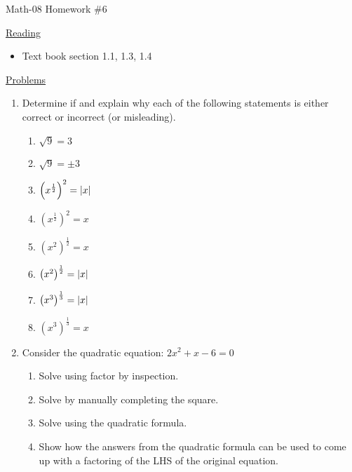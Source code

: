 \documentclass[letterpaper,12pt,fleqn]{article}
\begin{document}
\begin{center}
\Large Math-08 Homework \#6
\end{center}

\vspace{0.5in}

\underline{Reading}

\begin{itemize}
\item Text book section 1.1, 1.3, 1.4
\end{itemize}

\underline{Problems}

\begin{enumerate}
\item Determine if and explain why each of the following statements is either
  correct or incorrect (or misleading).
\begin{enumerate}
\item $\sqrt{9}=3$
\item $\sqrt{9}=\pm3$
\item $\left(x^{\frac{1}{2}}\right)^2=\lvert x\rvert$
\item $\left(x^{\frac{1}{2}}\right)^2=x$
\item $\left(x^2\right)^{\frac{1}{2}}=x$
\item $\left(x^2\right)^{\frac{1}{2}}=\lvert x\rvert$
\item $\left(x^3\right)^{\frac{1}{3}}=\lvert x\rvert$
\item $\left(x^3\right)^{\frac{1}{3}}=x$
\end{enumerate}

\item Consider the quadratic equation: $2x^2+x-6=0$
  \begin{enumerate}
  \item Solve using factor by inspection.
  \item Solve by manually completing the square.
  \item Solve using the quadratic formula.
  \item Show how the answers from the quadratic formula can be used to come up
    with a factoring of the LHS of the original equation.
  \end{enumerate}
\end{enumerate}
  
\end{document}
